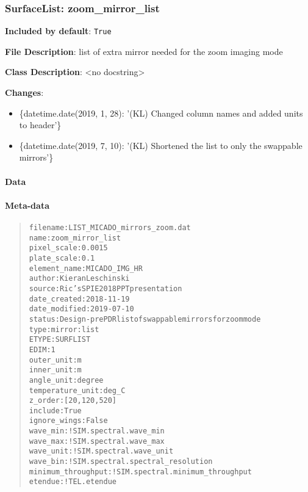 \subsubsection{SurfaceList: \textquotedbl{}zoom\_mirror\_list\textquotedbl{}%
  \label{surfacelist-zoom-mirror-list}%
}

\textbf{Included by default}: \texttt{True}

\textbf{File Description}: list of extra mirror needed for the zoom imaging mode

\textbf{Class Description}: <no docstring>

\textbf{Changes}:

\begin{itemize}
\item \{datetime.date(2019, 1, 28): '(KL) Changed column names and added units to header'\}

\item \{datetime.date(2019, 7, 10): '(KL) Shortened the list to only the swappable mirrors'\}
\end{itemize}


\paragraph{Data%
  \label{data}%
}


\paragraph{Meta-data%
  \label{meta-data}%
}

\begin{quote}
\begin{alltt}
          filename : LIST_MICADO_mirrors_zoom.dat
              name : zoom_mirror_list
       pixel_scale : 0.0015
       plate_scale : 0.1
      element_name : MICADO_IMG_HR
            author : Kieran Leschinski
            source : Ric's SPIE 2018 PPT presentation
      date_created : 2018-11-19
     date_modified : 2019-07-10
            status : Design - pre PDR list of swappable mirrors for zoom mode
              type : mirror:list
             ETYPE : SURFLIST
              EDIM : 1
        outer_unit : m
        inner_unit : m
        angle_unit : degree
  temperature_unit : deg_C
           z_order : [20, 120, 520]
           include : True
      ignore_wings : False
          wave_min : !SIM.spectral.wave_min
          wave_max : !SIM.spectral.wave_max
         wave_unit : !SIM.spectral.wave_unit
          wave_bin : !SIM.spectral.spectral_resolution
minimum_throughput : !SIM.spectral.minimum_throughput
           etendue : !TEL.etendue
\end{alltt}
\end{quote}


